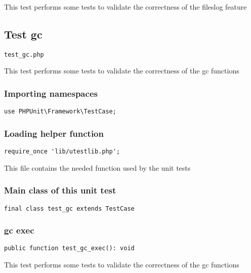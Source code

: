 \documentclass[a4paper]{article}
\begin{document}
This test performs some tests to validate the correctness
of the fileslog feature

\hypertarget{toc181}{}
\subsection{Test gc}

\begin{lstlisting}
test_gc.php
\end{lstlisting}

This test performs some tests to validate the correctness
of the gc functions

\hypertarget{toc182}{}
\subsubsection{Importing namespaces}

\begin{lstlisting}
use PHPUnit\Framework\TestCase;
\end{lstlisting}

\hypertarget{toc183}{}
\subsubsection{Loading helper function}

\begin{lstlisting}
require_once 'lib/utestlib.php';
\end{lstlisting}

This file contains the needed function used by the unit tests

\hypertarget{toc184}{}
\subsubsection{Main class of this unit test}

\begin{lstlisting}
final class test_gc extends TestCase
\end{lstlisting}

\hypertarget{toc185}{}
\subsubsection{gc exec}

\begin{lstlisting}
public function test_gc_exec(): void
\end{lstlisting}

This test performs some tests to validate the correctness
of the gc functions
\end{document}
